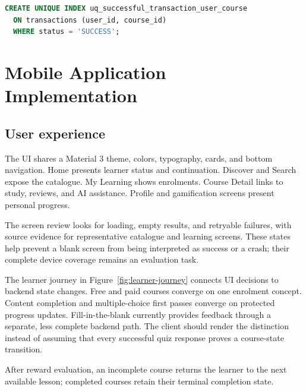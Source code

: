 \documentclass[12pt,a4paper,oneside]{report}
\begin{document}
\begin{lstlisting}[language=SQL,caption={Implemented uniqueness for a successful development payment}]
CREATE UNIQUE INDEX uq_successful_transaction_user_course
  ON transactions (user_id, course_id)
  WHERE status = 'SUCCESS';
\end{lstlisting}

\chapter{Mobile Application Implementation}
\section{User experience}
The UI shares a Material 3 theme, colors, typography, cards, and bottom navigation.
Home presents learner status and continuation. Discover and Search expose the
catalogue. My Learning shows enrolments. Course Detail links to study, reviews, and
AI assistance. Profile and gamification screens present personal progress.

The screen review looks for loading, empty results, and retryable failures, with
source evidence for representative catalogue and learning screens. These states
help prevent a blank screen from being interpreted as success or a crash; their
complete device coverage remains an evaluation task.

The learner journey in Figure~\ref{fig:learner-journey} connects UI decisions to
backend state changes. Free and paid courses converge on one enrolment concept.
Content completion and multiple-choice first passes converge on protected progress
updates. Fill-in-the-blank currently provides feedback through a separate, less
complete backend path. The client should render the distinction instead of assuming
that every successful quiz response proves a course-state transition.

\learnerjourneydiagram

After reward evaluation, an incomplete course returns the learner to the next available
lesson; completed courses retain their terminal completion state.
\end{document}
